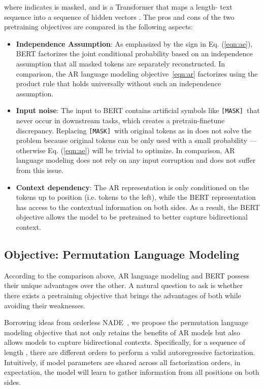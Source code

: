 \documentclass{article}
\newcommand{\mask}{\texttt{\small [MASK]}}\newcommand{\cls}{\texttt{\small [CLS]}}\newcommand{\sep}{\texttt{\small [SEP]}}\newcommand{\unk}{\texttt{unk}}
\begin{document}
where  indicates  is masked, and  is a Transformer that maps a length- text sequence  into a sequence of hidden vectors .
The pros and cons of the two pretraining objectives are compared in the following aspects:
\begin{itemize}[leftmargin=*,topsep=0em,itemsep=0em]
\item \textbf{Independence Assumption}: 
As emphasized by the  sign in Eq. (\ref{eqn:ae}), BERT factorizes the joint conditional probability  based on an independence assumption that all masked tokens  are separately reconstructed.
In comparison, the AR language modeling objective~\eqref{eqn:ar} factorizes  using the product rule that holds universally without such an independence assumption.
\item \textbf{Input noise}:
The input to BERT contains artificial symbols like \mask~that never occur in downstream tasks, which creates a pretrain-finetune discrepancy.
Replacing \mask~with original tokens as in \cite{devlin2018bert} does not solve the problem
because original tokens can be only used with a small probability --- otherwise Eq. (\ref{eqn:ae}) will be trivial to optimize.
In comparison, AR language modeling does not rely on any input corruption and does not suffer from this issue.
\item \textbf{Context dependency}: The AR representation  is only conditioned on the tokens up to position  (i.e. tokens to the left), while the BERT representation  has access to the contextual information on both sides.
As a result, the BERT objective allows the model to be pretrained to better capture bidirectional context. 


\end{itemize}





\subsection{Objective: Permutation Language Modeling}
\label{sec:objective}

According to the comparison above, AR language modeling and BERT possess their unique advantages over the other.
A natural question to ask is whether there exists a pretraining objective that brings the advantages of both while avoiding their weaknesses.

Borrowing ideas from orderless NADE~\cite{uria2016neural}, we propose the permutation language modeling objective that not only retains the benefits of AR models but also allows models to capture bidirectional contexts.
Specifically, for a sequence  of length , there are  different orders to perform a valid autoregressive factorization.
Intuitively, if model parameters are shared across all factorization orders, in expectation, the model will learn to gather information from all positions on both sides.
\end{document}
